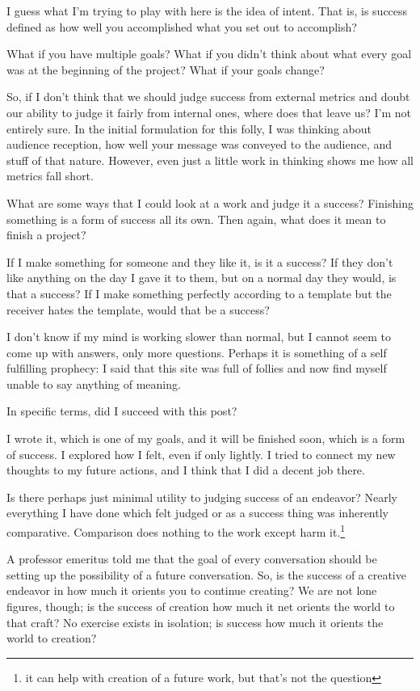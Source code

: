 \documentclass[12pt]{article}
\renewcommand{\,}{\textsuperscript{,}}
\begin{document}
I guess what I'm trying to play with here is the idea of intent.  
That is, is success defined as how well you accomplished what you set out to accomplish?

What if you have multiple goals?  
What if you didn't think about what every goal was at the beginning of the project?  
What if your goals change?

So, if I don't think that we should judge success from external metrics and doubt our ability to judge it fairly from internal ones, where does that leave us?  
I'm not entirely sure.  
In the initial formulation for this folly, I was thinking about audience reception, how well your message was conveyed to the audience, and stuff of that nature.  
However, even just a little work in thinking shows me how all metrics fall short.

What are some ways that I could look at a work and judge it a success?  
Finishing something is a form of success all its own.  
Then again, what does it mean to finish a project?

If I make something for someone and they like it, is it a success?  
If they don't like anything on the day I gave it to them, but on a normal day they would, is that a success?  
If I make something perfectly according to a template but the receiver hates the template, would that be a success?

I don't know if my mind is working slower than normal, but I cannot seem to come up with answers, only more questions.  
Perhaps it is something of a self fulfilling prophecy: I said that this site was full of follies and now find myself unable to say anything of meaning.

In specific terms, did I succeed with this post?

I wrote it, which is one of my goals, and it will be finished soon, which is a form of success.  
I explored how I felt, even if only lightly.  
I tried to connect my new thoughts to my future actions, and I think that I did a decent job there.

Is there perhaps just minimal utility to judging success of an endeavor?  
Nearly everything I have done which felt judged or as a success thing was inherently comparative.  
Comparison does nothing to the work except harm it.\footnote{it can help with creation of a future work, but that's not the question}

A professor emeritus told me that the goal of every conversation should be setting up the possibility of a future conversation.  
So, is the success of a creative endeavor in how much it orients you to continue creating?  
We are not lone figures, though; is the success of creation how much it net orients the world to that craft?  
No exercise exists in isolation; is success how much it orients the world to creation?
\end{document}
